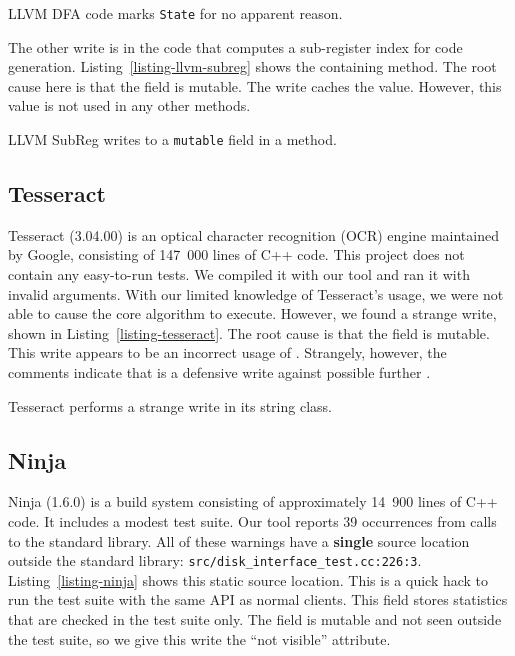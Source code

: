 \begin{listing}[!htb]
  \caption{LLVM DFA code marks \texttt{State} \const{} for no apparent reason.}
  \label{listing-llvm-dfa}
  \centering
  
\end{listing}

The other write is in the code that computes a sub-register index for code
generation.
Listing~\ref{listing-llvm-subreg} shows the containing method.
The root cause here is that the  field is mutable.
The write caches the value.
However, this value is not used in any other methods.

\begin{listing}[!htb]
  \caption{LLVM SubReg writes to a \texttt{mutable} field in a \const{} method.}
  \label{listing-llvm-subreg}
  \centering
  
\end{listing}

\subsection{Tesseract}

Tesseract (3.04.00) is an optical character recognition (OCR) engine maintained
by Google, consisting of 147~000 lines of C++ code.
This project does not contain any easy-to-run tests.
We compiled it with our tool and ran it with invalid arguments.
With our limited knowledge of Tesseract's usage, we were not able to cause the
core algorithm to execute.
However, we found a strange write, shown in Listing~\ref{listing-tesseract}.
The root cause is that the  field is mutable.
This write appears to be an incorrect usage of \const{}.
Strangely, however, the comments indicate that is a defensive write against
possible further \wstcqs{}.

\begin{listing}[!htb]
  \caption{Tesseract performs a strange write in its string class.}
  \label{listing-tesseract}
  \centering
  
\end{listing}

\subsection{Ninja}

Ninja (1.6.0) is a build system consisting of approximately 14~900 lines of C++
code.
It includes a modest test suite.
Our tool reports 39 occurrences from calls to the standard library.
All of these warnings have a {\bf single} source location outside the standard
library: \texttt{src/disk\_interface\_test.cc:226:3}.
Listing~\ref{listing-ninja} shows this static source location.
This is a quick hack to run the test suite with the same API as normal clients.
This field stores statistics that are checked in the test suite only.
The field is mutable and not seen outside the test suite, so we give this write
the ``not visible'' attribute.

